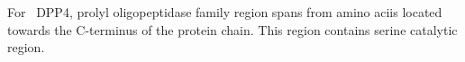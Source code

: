 For~ DPP4, prolyl oligopeptidase family region spans from amino aciis located towards the C-terminus of the protein chain. This region contains serine catalytic region.  